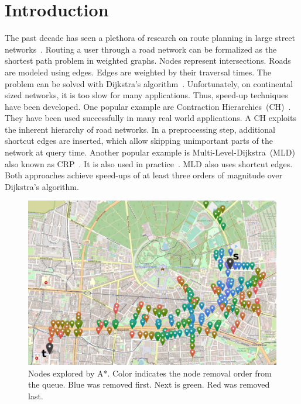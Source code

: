\documentclass[manuscript,review]{acmart}
\begin{document}


\maketitle

\section{Introduction}
\label{sec:intro}
The past decade has seen a plethora of research on route planning in large street networks~\cite{bdgmpsww-rptn-16}.
Routing a user through a road network can be formalized as the shortest path problem in weighted graphs.
Nodes represent intersections.
Roads are modeled using edges.
Edges are weighted by their traversal times.
The problem can be solved with Dijkstra's algorithm~\cite{d-ntpcg-59}.
Unfortunately, on continental sized networks, it is too slow for many applications.
Thus, speed-up techniques have been developed.
One popular example are Contraction Hierarchies~(CH)~\cite{gssv-erlrn-12}.
They have been used successfully in many real world applications.
A CH exploits the inherent hierarchy of road networks.
In a preprocessing step, additional shortcut edges are inserted, which allow skipping unimportant parts of the network at query time.
Another popular example is Multi-Level-Dijkstra~(MLD)~\cite{swz-umlgt-02} also known as CRP~\cite{dgpw-crprn-13}.
It is also used in practice~\cite{bingblog}.
MLD also uses shortcut edges.
Both approaches achieve speed-ups of at least three orders of magnitude over Dijkstra's algorithm.

\begin{figure}
\centering
\includegraphics[width=.6\columnwidth]{fig/searchspace_st.png}
\caption{Nodes explored by A*. Color indicates the node removal order from the queue. Blue was removed first. Next is green. Red was removed last.}
\label{img:search-space}
\end{figure}
\end{document}
